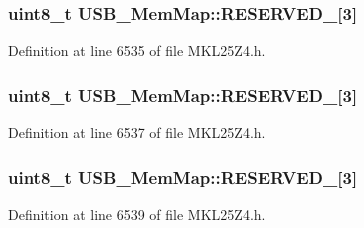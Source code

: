 \subsubsection[{\texorpdfstring{R\+E\+S\+E\+R\+V\+E\+D\+\_\+17}{RESERVED_17}}]{\setlength{\rightskip}{0pt plus 5cm}uint8\+\_\+t U\+S\+B\+\_\+\+Mem\+Map\+::\+R\+E\+S\+E\+R\+V\+E\+D\+\_\mbox{[}3\mbox{]}}\hypertarget{struct_u_s_b___mem_map_a8af0319fa823d36eb32a0276ab5052c7}{}\label{struct_u_s_b___mem_map_a8af0319fa823d36eb32a0276ab5052c7}


Definition at line 6535 of file M\+K\+L25\+Z4.\+h.

\subsubsection[{\texorpdfstring{R\+E\+S\+E\+R\+V\+E\+D\+\_\+18}{RESERVED_18}}]{\setlength{\rightskip}{0pt plus 5cm}uint8\+\_\+t U\+S\+B\+\_\+\+Mem\+Map\+::\+R\+E\+S\+E\+R\+V\+E\+D\+\_\mbox{[}3\mbox{]}}\hypertarget{struct_u_s_b___mem_map_af1b3dbe2aa5bd0b752abbdf9c29d70b6}{}\label{struct_u_s_b___mem_map_af1b3dbe2aa5bd0b752abbdf9c29d70b6}


Definition at line 6537 of file M\+K\+L25\+Z4.\+h.

\subsubsection[{\texorpdfstring{R\+E\+S\+E\+R\+V\+E\+D\+\_\+19}{RESERVED_19}}]{\setlength{\rightskip}{0pt plus 5cm}uint8\+\_\+t U\+S\+B\+\_\+\+Mem\+Map\+::\+R\+E\+S\+E\+R\+V\+E\+D\+\_\mbox{[}3\mbox{]}}\hypertarget{struct_u_s_b___mem_map_ae58f8f823509af251c9145ef32f35c82}{}\label{struct_u_s_b___mem_map_ae58f8f823509af251c9145ef32f35c82}


Definition at line 6539 of file M\+K\+L25\+Z4.\+h.


